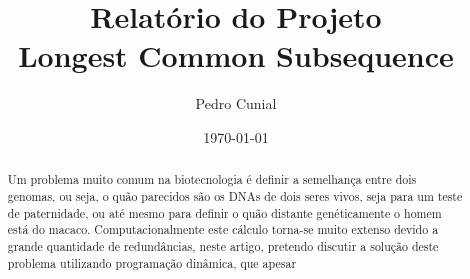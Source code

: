 \documentclass[11pt]{article}
\author{Pedro Cunial}
\date{\today}
\title{Relatório do Projeto\\
  \large Longest Common Subsequence}
\begin{document}
\maketitle
\tableofcontents

\begin{abstract}
  Um problema muito comum na biotecnologia é definir a semelhança entre dois
  genomas, ou seja, o quão parecidos são os DNAs de dois seres vivos, seja para
  um teste de paternidade, ou até mesmo para definir o quão distante
  genéticamente o homem está do macaco. Computacionalmente este cálculo torna-se muito
  extenso devido a grande quantidade de redundâncias, neste artigo, pretendo
  discutir a solução deste problema utilizando programação dinâmica, que apesar
\end{abstract}
\end{document}
